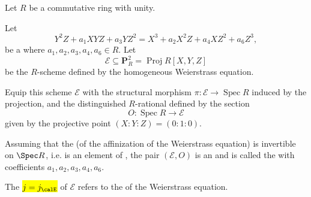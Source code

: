 
\begin{definition} \label{definition:elliptic_curve_over_a_ring_given_by_a_projective_weierstrass_equation_with_invertible_discriminant}
    Let $R$ be a commutative ring with unity.

    Let 
    $$ Y^2 Z + a_1 X Y Z + a_3 Y Z^2 = X^3 + a_2 X^2 Z + a_4 X Z^2 + a_6 Z^3, $$
    be a  where $a_1,a_2,a_3,a_4,a_6 \in R$.  
    Let
    $$ \mathcal{E} \subseteq \mathbf{P}^2_R = \operatorname{Proj} R[X,Y,Z] $$
    be the $R$-scheme defined by the homogeneous Weierstrass equation.

    Equip this scheme $\mathcal{E}$ with the structural morphism $\pi: \mathcal{E} \to \operatorname{Spec} R$ induced by the projection, and the distinguished $R$-rational  defined by the section
    $$ O : \operatorname{Spec} R \to \mathcal{E} $$
    given by the projective point $(X:Y:Z) = (0:1:0)$. 
    
    Assuming that the  (of the affinization of the Weierstrass equation) is invertible on $\Spec R$, i.e. is an element of , the pair $(\mathcal{E}, O)$ is an  and is called the  with coefficients $a_1,a_2,a_3,a_4,a_6$.

    The 
     \hl{$j = j_{\calE}$} of $\mathcal{E}$ refers to the 
     of the Weierstrass equation.
    

\end{definition}
